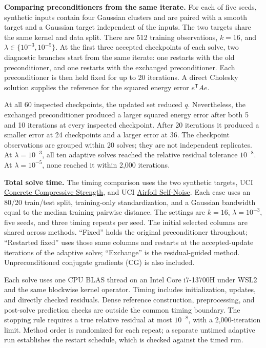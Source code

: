 \documentclass[11pt,letterpaper]{article}
\begin{document}
\textbf{Comparing preconditioners from the same iterate.}
For each of five seeds, synthetic inputs contain four Gaussian clusters and are
paired with a smooth target and a Gaussian target independent of the inputs. The two targets
share the same kernel and data split. There are 512 training observations,
$k=16$, and $\lambda\in\{10^{-3},10^{-5}\}$.
At the first three accepted checkpoints of each solve, two diagnostic branches
start from the same iterate: one restarts with the old preconditioner, and one
restarts with the exchanged preconditioner. Each preconditioner is then held
fixed for up to 20 iterations. A direct Cholesky solution supplies the reference
for the squared energy error $e^{\mathsf T}Ae$.



At all 60 inspected checkpoints, the updated set reduced $q$. Nevertheless, the exchanged
preconditioner produced a larger squared energy error after both 5 and 10
iterations at every inspected checkpoint. After 20 iterations it produced a
smaller error at 24 checkpoints and a larger error at 36. The checkpoint
observations are grouped within 20 solves; they are not independent replicates.
At $\lambda=10^{-3}$, all ten adaptive solves reached the relative residual
tolerance $10^{-8}$. At $\lambda=10^{-5}$, none reached it within 2,000 iterations.

\textbf{Total solve time.}
The timing comparison uses the two synthetic targets, UCI
\href{https://archive.ics.uci.edu/dataset/165/concrete+compressive+strength}{Concrete Compressive Strength},
and UCI \href{https://archive.ics.uci.edu/dataset/291/airfoil+self+noise}{Airfoil Self-Noise}.
Each case uses an 80/20 train/test split,
training-only standardization, and a Gaussian bandwidth equal to the median
training pairwise distance. The settings are $k=16$, $\lambda=10^{-3}$, five
seeds, and three timing repeats per seed. The initial selected columns are
shared across methods. ``Fixed'' holds the original preconditioner throughout;
``Restarted fixed'' uses those same columns and restarts at the accepted-update
iterations of the adaptive solve; ``Exchange'' is the residual-guided method.
Unpreconditioned conjugate gradients (CG) is also included.

Each solve uses one CPU BLAS thread on an Intel Core i7-13700H under WSL2 and
the same blockwise kernel operator.
Timing includes initialization, updates, and directly checked residuals.
Dense reference construction, preprocessing, and post-solve prediction checks
are outside the common timing boundary. The stopping rule requires a true
relative residual at most $10^{-8}$, with a 2,000-iteration limit.
Method order is randomized for each repeat; a separate untimed adaptive run
establishes the restart schedule, which is checked against the timed run.
\end{document}
